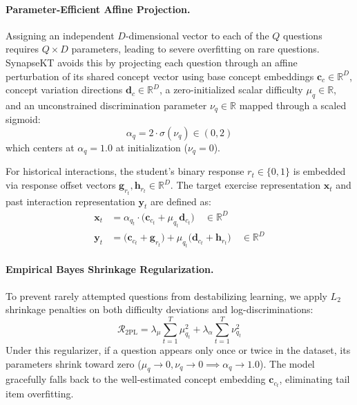 \documentclass[11pt]{article}
\begin{document}
\paragraph{Parameter-Efficient Affine Projection.}
Assigning an independent $D$-dimensional vector to each of the $Q$ questions requires $Q \times D$ parameters, leading to severe overfitting on rare questions. SynapseKT avoids this by projecting each question through an affine perturbation of its shared concept vector using base concept embeddings $\mathbf{c}_c \in \mathbb{R}^D$, concept variation directions $\mathbf{d}_c \in \mathbb{R}^D$, a zero-initialized scalar difficulty $\mu_q \in \mathbb{R}$, and an unconstrained discrimination parameter $\nu_q \in \mathbb{R}$ mapped through a scaled sigmoid:
\begin{equation}
\alpha_q = 2 \cdot \sigma(\nu_q) \in (0, 2)
\end{equation}
which centers at $\alpha_q = 1.0$ at initialization ($\nu_q = 0$).

For historical interactions, the student's binary response $r_t \in \{0, 1\}$ is embedded via response offset vectors $\mathbf{g}_{r_t}, \mathbf{h}_{r_t} \in \mathbb{R}^D$. The target exercise representation $\mathbf{x}_t$ and past interaction representation $\mathbf{y}_t$ are defined as:
\begin{align}
\mathbf{x}_t &= \alpha_{q_t} \cdot \big(\mathbf{c}_{c_t} + \mu_{q_t} \mathbf{d}_{c_t}\big) \quad \in \mathbb{R}^D \\
\mathbf{y}_t &= \big(\mathbf{c}_{c_t} + \mathbf{g}_{r_t}\big) + \mu_{q_t} \big(\mathbf{d}_{c_t} + \mathbf{h}_{r_t}\big) \quad \in \mathbb{R}^D
\end{align}

\paragraph{Empirical Bayes Shrinkage Regularization.}
To prevent rarely attempted questions from destabilizing learning, we apply $L_2$ shrinkage penalties on both difficulty deviations and log-discriminations:
\begin{equation}
\label{eq:reg_loss}
\mathcal{R}_{\text{2PL}} = \lambda_\mu \sum_{t=1}^T \mu_{q_t}^2 + \lambda_\alpha \sum_{t=1}^T \nu_{q_t}^2
\end{equation}
Under this regularizer, if a question appears only once or twice in the dataset, its parameters shrink toward zero ($\mu_q \to 0, \nu_q \to 0 \implies \alpha_q \to 1.0$). The model gracefully falls back to the well-estimated concept embedding $\mathbf{c}_{c_t}$, eliminating tail item overfitting.
\end{document}
